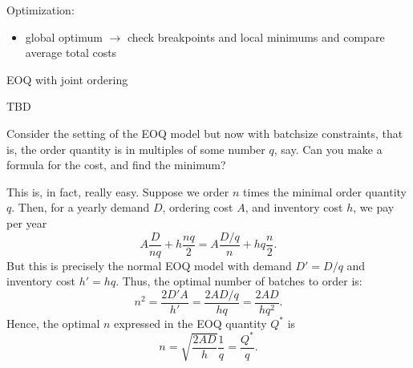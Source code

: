 \begin{question}
\begin{solution}
\begin{center}
\end{center}

Optimization:
\begin{itemize}
\item global optimum $\rightarrow$ check breakpoints and local minimums and compare average total costs
\end{itemize}
  \end{solution}
\end{question}



\begin{question}
EOQ with joint ordering
  \begin{solution}
    TBD
  \end{solution}
\end{question}

\begin{question}
  Consider the setting of the EOQ model but now with batchsize
  constraints, that is, the order quantity is in multiples of some number $q$, say. Can you make a formula for the cost, and find the minimum?
  \begin{solution}
This is, in fact, really easy. Suppose we order $n$ times the minimal order quantity $q$. Then, for a yearly demand $D$, ordering cost $A$, and inventory cost $h$, we pay per year
\begin{equation*}
  A \frac{D}{nq} + h\frac{nq}2 = A\frac{D/q}n + hq\frac{n}2.
\end{equation*}
But this is precisely the normal EOQ model with demand $D'=D/q$ and inventory cost $h'=hq$. Thus, the optimal number of batches to order is:
\begin{equation*}
  n^2 = \frac{2D'A}{h'} = \frac{2AD/q}{hq} = \frac{2AD}{hq^2}.
\end{equation*}
Hence, the optimal $n$ expressed in the EOQ quantity $Q^*$ is 
\begin{equation*}
  n = \sqrt{\frac{2AD}{h}}\frac1q=\frac{Q^*}q.
\end{equation*}
  \end{solution}
\end{question}


